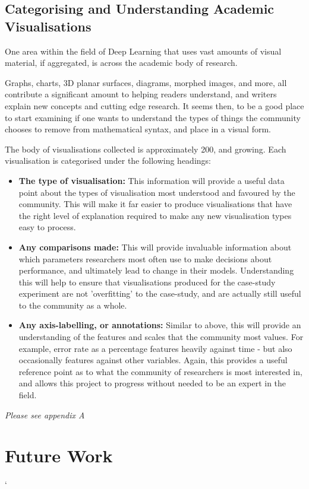 \documentclass[a4paper,11pt,titlepage]{article}
\begin{document}
		\subsection{Categorising and Understanding Academic Visualisations}
		One area within the field of Deep Learning that uses vast amounts of visual material, if aggregated, is across the academic body of research. 
		\par 
		Graphs, charts, 3D planar surfaces, diagrams, morphed images, and more, all contribute a significant amount to helping readers understand, and writers explain new concepts and cutting edge research. It seems then, to be a good place to start examining if one wants to understand the types of things the community chooses to remove from mathematical syntax, and place in a visual form.
		\par	
		The body of visualisations collected is approximately 200, and growing. Each visualisation is categorised under the following headings:
		\begin{itemize}
			\item \textbf{The type of visualisation:} 				This information will provide a useful data point about the types of visualisation most understood and favoured by the community. This will make it far easier to produce visualisations that have the right level of explanation required to make any new visualisation types easy to process.
			\item \textbf{Any comparisons made:} 
			This will provide invaluable information about which parameters researchers most often use to make decisions about performance, and ultimately lead to change in their models. Understanding this will help to ensure that visualisations produced for the case-study experiment are not 'overfitting' to the case-study, and are actually still useful to the community as a whole.
			\item \textbf{Any axis-labelling, or annotations:}
			Similar to above, this will provide an understanding of the features and scales that the community most values. For example, error rate as a percentage features heavily against time - but also occasionally features against other variables. Again, this provides a useful reference point as to what the community of researchers is most interested in, and allows this project to progress without needed to be an expert in the field.
		\end{itemize}
		\textit{Please see appendix A}

\clearpage

\section{Future Work}`
\end{document}
